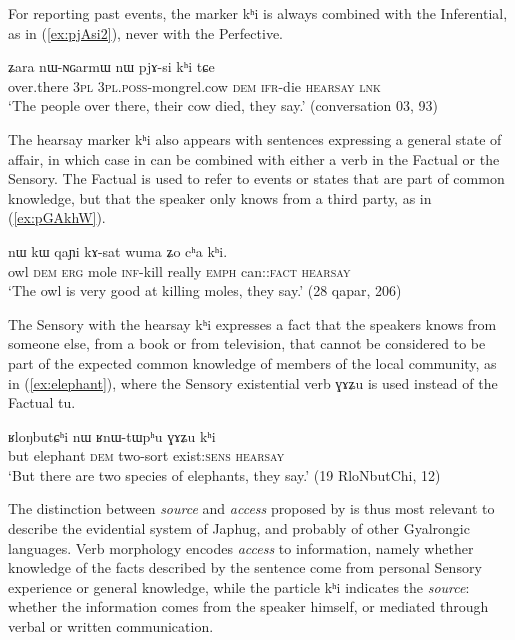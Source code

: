 \documentclass[oldfontcommands,oneside,a4paper,11pt]{article}
\newcommand{\ipa}[1]{{\phon \mbox{#1}}} %
\newcommand{\refb}[1]{(\ref{#1})}
\newcommand{\factual}[1]{\textsc{:fact}}
\begin{document}
For reporting past events, the marker \ipa{kʰi} is always combined with the Inferential, as in \refb{ex:pjAsi2}, never with the Perfective.

\begin{exe}
\ex \label{ex:pjAsi2}
\gll \ipa{tɕɤtu} 	\ipa{ʑara} 	\ipa{nɯ-ɴɢarmɯ} 	\ipa{nɯ} 	\ipa{pjɤ-si} 	\ipa{kʰi} 	\ipa{tɕe} \\
over.there \textsc{3pl} \textsc{3pl.poss}-mongrel.cow  \textsc{dem} \textsc{ifr}-die \textsc{hearsay} \textsc{lnk} \\
\glt `The people over there, their cow died, they say.' (conversation 03, 93)
\end{exe} 
 
 The hearsay marker \ipa{kʰi} also appears with sentences expressing a general state of affair, in which case in can be combined with either a verb in the Factual or the Sensory. The Factual is used to refer to events or states that are part of common knowledge, but that the speaker only knows from a third party, as in \refb{ex:pGAkhW}.
 
 \begin{exe}
\ex \label{ex:pGAkhW}
\gll   \ipa{pɣɤkhɯ}  	\ipa{nɯ}  	\ipa{kɯ}  	\ipa{qaɲi}  	\ipa{kɤ-sat}  	\ipa{wuma}  	\ipa{ʑo}  	\ipa{cʰa} 	\ipa{kʰi.}  \\
owl \textsc{dem} \textsc{erg} mole \textsc{inf}-kill really \textsc{emph} can:\factual{} \textsc{hearsay} \\
\glt `The owl is very good at killing moles, they say.' (28 qapar, 206)
\end{exe} 
  
  The Sensory with the hearsay \ipa{kʰi} expresses a fact that the speakers knows from someone else, from  a book or from television, that cannot be considered to be part of the expected common knowledge of members of the local community, as in \refb{ex:elephant}, where the Sensory existential verb \ipa{ɣɤʑu} is used instead of the Factual \ipa{tu}.
  
   \begin{exe}
\ex \label{ex:elephant}
\gll   \ipa{tɕeri}  	\ipa{ʁloŋbutɕʰi}  	\ipa{nɯ}  	\ipa{ʁnɯ-tɯpʰu}  	\ipa{ɣɤʑu}  	\ipa{kʰi}  \\
  but elephant \textsc{dem} two-sort exist:\textsc{sens} \textsc{hearsay} \\
\glt `But there are two species of elephants, they say.' (19 RloNbutChi, 12)
\end{exe} 

The distinction between \textit{source} and \textit{access}  proposed by \citet{tournadre14evidentiality} is thus most relevant to describe the evidential system of Japhug, and probably of other Gyalrongic languages. Verb morphology encodes \textit{access} to information, namely whether knowledge of the facts described by the sentence come from personal Sensory experience or general knowledge, while the particle \ipa{kʰi} indicates the \textit{source}: whether the information comes from the speaker himself, or mediated through verbal or written communication.
\end{document}
